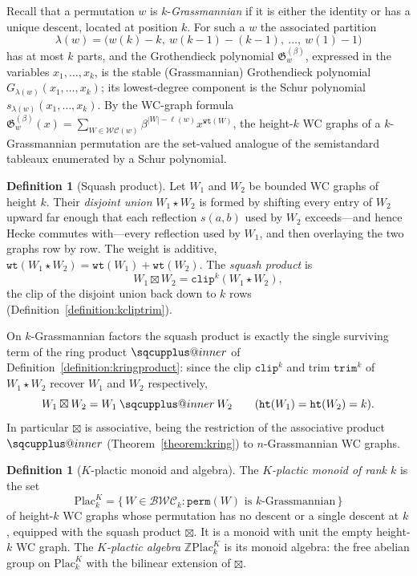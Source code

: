\documentclass{amsart}
\makeatletter
\newcommand{\sqcupplus@inner}[2]{%
  \vcenter{\hbox{\ooalign{%
    \hfil$\m@th#1\sqcup$\hfil\cr
    \hfil\raisebox{0.15ex}{$\m@th#1\scriptscriptstyle+$}\hfil\cr
  }}}%
}
\newcommand{\sqcupplus}{\mathbin{\mathpalette\sqcupplus@inner\relax}}
\theoremstyle{definition}
\newtheorem{definition}[lemma]{Definition}
\theoremstyle{remark}
\numberwithin{equation}{subsection}
\newcommand{\wof}[1]{\mathtt{perm}(#1)}
\newcommand{\wtt}{\mathtt{wt}}
\newcommand{\kplac}{\mathrm{Plac}^K}
\newcommand{\trm}{\mathtt{trim}}
\newcommand{\hr}{\mathtt{ht}}
\newcommand{\clp}{\mathtt{clip}}
\newcommand{\BWC}{\mathcal{BWC}}
\newcommand{\WC}{\mathcal{WC}}
\makeatother
\begin{document}
Recall that a permutation $w$ is $k$-\emph{Grassmannian} if it is either the
identity or has a unique descent, located at position $k$. For such a $w$ the
associated partition
$$\lambda(w)=\bigl(w(k)-k,\ w(k-1)-(k-1),\ \ldots,\ w(1)-1\bigr)$$
has at most $k$ parts, and the Grothendieck polynomial
$\mathfrak{G}^{(\beta)}_w$, expressed in the variables $x_1,\ldots,x_k$, is the
stable (Grassmannian) Grothendieck polynomial $G_{\lambda(w)}(x_1,\ldots,x_k)$;
its lowest-degree component is the Schur polynomial
$s_{\lambda(w)}(x_1,\ldots,x_k)$. By the WC-graph formula
$\mathfrak{G}^{(\beta)}_w(x)=\sum_{W\in\WC(w)}\beta^{|W|-\ell(w)}x^{\wtt(W)}$,
the height-$k$ WC graphs of a $k$-Grassmannian permutation are the set-valued
analogue of the semistandard tableaux enumerated by a Schur polynomial.

\begin{definition}[Squash product]\label{definition:ksquash}
Let $W_1$ and $W_2$ be bounded WC graphs of height $k$. Their \emph{disjoint
union} $W_1\star W_2$ is formed by shifting every entry of $W_2$ upward far
enough that each reflection $s(a,b)$ used by $W_2$ exceeds---and hence Hecke
commutes with---every reflection used by $W_1$, and then overlaying the two
graphs row by row. The weight is additive, $\wtt(W_1\star
W_2)=\wtt(W_1)+\wtt(W_2)$. The \emph{squash product} is
$$W_1\boxtimes W_2=\clp^{k}(W_1\star W_2),$$
the clip of the disjoint union back down to $k$ rows
(Definition~\ref{definition:kcliptrim}).
\end{definition}

On $k$-Grassmannian factors the squash product is exactly the single surviving
term of the ring product $\sqcupplus$ of
Definition~\ref{definition:kringproduct}: since the clip $\clp^{k}$ and trim
$\trm^{k}$ of $W_1\star W_2$ recover $W_1$ and $W_2$ respectively,
$$W_1\boxtimes W_2 = W_1\sqcupplus W_2\qquad(\hr(W_1)=\hr(W_2)=k).$$
In particular $\boxtimes$ is associative, being the restriction of the
associative product $\sqcupplus$ (Theorem~\ref{theorem:kring}) to
$n$-Grassmannian WC graphs.

\begin{definition}[$K$-plactic monoid and algebra]\label{definition:kplac-monoid}
The \emph{$K$-plactic monoid of rank $k$} is the set
$$\kplac_k=\bigl\{\,W\in\BWC_k:\wof{W}\text{ is }k\text{-Grassmannian}\,\bigr\}$$
of height-$k$ WC graphs whose permutation has no descent or a single descent at
$k$, equipped with the squash product $\boxtimes$. It is a monoid with unit the
empty height-$k$ WC graph. The \emph{$K$-plactic algebra} $\mathbb{Z}\kplac_k$ is
its monoid algebra: the free abelian group on $\kplac_k$ with the bilinear
extension of $\boxtimes$.
\end{definition}
\end{document}
